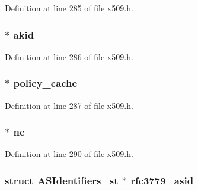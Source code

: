 Definition at line 285 of file x509.\+h.

\subsubsection[{\texorpdfstring{akid}{akid}}]{ $\ast$ akid}\hypertarget{structx509__st_a08ed0324382dcedeff14b415417cd511}{}\label{structx509__st_a08ed0324382dcedeff14b415417cd511}


Definition at line 286 of file x509.\+h.

\subsubsection[{\texorpdfstring{policy\+\_\+cache}{policy_cache}}]{ $\ast$ policy\+\_\+cache}\hypertarget{structx509__st_afeb4dc7817f2e7d7c698aad8311779f5}{}\label{structx509__st_afeb4dc7817f2e7d7c698aad8311779f5}


Definition at line 287 of file x509.\+h.

\subsubsection[{\texorpdfstring{nc}{nc}}]{ $\ast$ nc}\hypertarget{structx509__st_a0b0e67d6b4e9d698e0f88a5f5427095c}{}\label{structx509__st_a0b0e67d6b4e9d698e0f88a5f5427095c}


Definition at line 290 of file x509.\+h.

\subsubsection[{\texorpdfstring{rfc3779\+\_\+asid}{rfc3779_asid}}]{\setlength{\rightskip}{0pt plus 5cm}struct {\bf A\+S\+Identifiers\+\_\+st} $\ast$ rfc3779\+\_\+asid}\hypertarget{structx509__st_a5cf497cd5deee712f6dec8e107d93cfa}{}\label{structx509__st_a5cf497cd5deee712f6dec8e107d93cfa}


